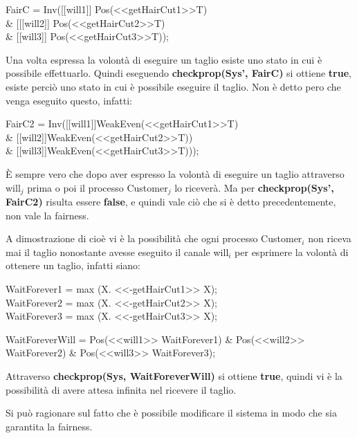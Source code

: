 \begin{center}
	\textsf{FairC = Inv([[will1]] Pos(<<getHairCut1>>T) \\\& [[[will2]] Pos(<<getHairCut2>>T) \\\& [[will3]] Pos(<<getHairCut3>>T)); }
\end{center}

Una volta espressa la volontà di eseguire un taglio esiste uno stato in cui è possibile effettuarlo. Quindi eseguendo \textbf{checkprop(Sys', FairC)} si ottiene \textbf{true}, esiste perciò uno stato in cui è possibile eseguire il taglio. Non è detto pero che venga eseguito questo, infatti:

\begin{center}
	\textsf{FairC2 = Inv([[will1]]WeakEven(<<getHairCut1>>T) \\\& [[will2]]WeakEven(<<getHairCut2>>T)) \\\& [[will3]]WeakEven(<<getHairCut3>>T)));}
\end{center}

È sempre vero che dopo aver espresso la volontà di eseguire un taglio attraverso \textsf{will$_{j}$} prima o poi il processo \textsf{Customer$_{j}$} lo riceverà. Ma per\textbf{ checkprop(Sys', FairC2)} risulta essere \textbf{false}, e quindi vale ciò che si è detto precedentemente, non vale la fairness.


A dimostrazione di cioè vi è la possibilità che ogni processo \textsf{Customer$_{i}$} non riceva mai il taglio nonostante avesse eseguito il canale \textsf{will$_{i}$} per esprimere la volontà di ottenere un taglio, infatti siano:\\
\begin{center}
	\textsf{WaitForever1 = max (X. <<-getHairCut1>> X);}\\
	\textsf{WaitForever2 = max (X. <<-getHairCut2>> X);}\\
	\textsf{WaitForever3 = max (X. <<-getHairCut3>> X);}\\\mbox{}
	
	
	\textsf{WaitForeverWill = Pos(<<will1>> WaitForever1) \& Pos(<<will2>> WaitForever2) \& Pos(<<will3>> WaitForever3);}
\end{center}

Attraverso \textbf{checkprop(Sys, WaitForeverWill)} si ottiene \textbf{true}, quindi vi è la possibilità di avere attesa infinita nel ricevere il taglio.

Si può ragionare sul fatto che è possibile modificare il sistema in modo che sia garantita la fairness.

